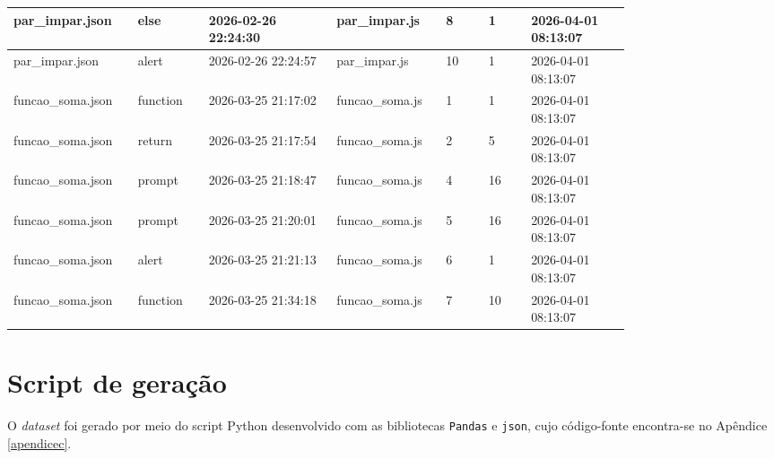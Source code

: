 \begin{table}[H]
\begin{tabular}{|p{0.14\linewidth}|p{0.10\linewidth}|p{0.18\linewidth}|p{0.12\linewidth}|p{0.06\linewidth}|p{0.06\linewidth}|p{0.14\linewidth}|}
\hline
par\_impar.json & else & 2026-02-26 22:24:30 & par\_impar.js & 8 & 1 & 2026-04-01 08:13:07 \\
\hline
par\_impar.json & alert & 2026-02-26 22:24:57 & par\_impar.js & 10 & 1 & 2026-04-01 08:13:07 \\
\hline
funcao\_soma.json & function & 2026-03-25 21:17:02 & funcao\_soma.js & 1 & 1 & 2026-04-01 08:13:07 \\
\hline
funcao\_soma.json & return & 2026-03-25 21:17:54 & funcao\_soma.js & 2 & 5 & 2026-04-01 08:13:07 \\
\hline
funcao\_soma.json & prompt & 2026-03-25 21:18:47 & funcao\_soma.js & 4 & 16 & 2026-04-01 08:13:07 \\
\hline
funcao\_soma.json & prompt & 2026-03-25 21:20:01 & funcao\_soma.js & 5 & 16 & 2026-04-01 08:13:07 \\
\hline
funcao\_soma.json & alert & 2026-03-25 21:21:13 & funcao\_soma.js & 6 & 1 & 2026-04-01 08:13:07 \\
\hline
funcao\_soma.json & function & 2026-03-25 21:34:18 & funcao\_soma.js & 7 & 10 & 2026-04-01 08:13:07 \\
\hline
\end{tabular}
\end{table}

\section*{Script de geração}

O \textit{dataset} foi gerado por meio do script Python desenvolvido com as bibliotecas \texttt{Pandas} e \texttt{json}, cujo código-fonte encontra-se no Apêndice \ref{apendicec}.